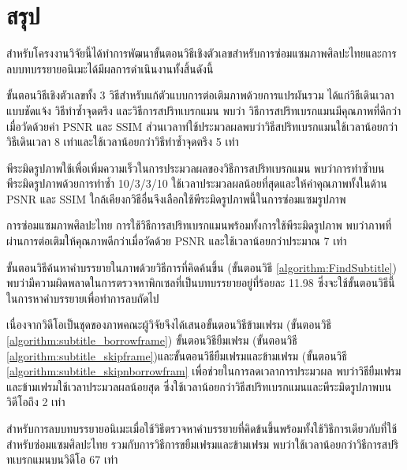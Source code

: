 \chapter{สรุป}

\hspace{1cm}สำหรับโครงงานวิจัยนี้ได้ทำการพัฒนาขั้นตอนวิธีเชิงตัวเลขสำหรับการซ่อมแซมภาพศิลปะไทยและการลบบทบรรยายอนิเมะได้มีผลการดำเนินงานทั้งสิ้นดังนี้

\hspace{1cm} ขั้นตอนวิธีเชิงตัวเลขทั้ง 3  วิธีสำหรับแก้ตัวแบบการต่อเติมภาพด้วยการแปรผันรวม ได้แก่วิธีเดินเวลาแบบชัดแจ้ง วิธีทำซ้ำจุดตรึง และวิธีการสปริทเบรกแมน พบว่า วิธีการสปริทเบรกแมนมีคุณภาพที่ดีกว่าเมื่อวัดด้วยค่า PSNR และ SSIM ส่วนเวลาท่ใช้ประมวลผลพบว่าวิธีสปริทเบรกแมนใช้เวลาน้อยกว่าวิธีเดินเวลา 8 เท่าและใช้เวลาน้อยกว่าวิธีทำซ้ำจุดตรึง 5 เท่า

\hspace{1cm} พีระมิดรูปภาพใช้เพื่อเพิ่มความเร็วในการประมวลผลของวิธีการสปริทเบรกแมน พบว่าการทำซ้ำบนพีระมิดรูปภาพด้วยการทำซ้ำ 10/3/3/10 ใช้เวลาประมวลผลน้อยที่สุดและให้ค่าคุณภาพทั้งในด้าน PSNR และ SSIM ใกล้เคียงกวิธีอื่นจึงเลือกใช้พีระมิดรูปภาพนี้ในการซ่อมแซมรูปภาพ

\hspace{1cm} การซ่อมแซมภาพศิลปะไทย การใช้วิธีการสปริทเบรกแมนพร้อมทั้งการใช้พีระมิดรูปภาพ พบว่าภาพที่ผ่านการต่อเติมให้คุณภาพดีกว่าเมื่อวัดด้วย PSNR และใช้เวลาน้อยกว่าประมาณ 7 เท่า

\hspace{1cm} ขั้นตอนวิธีค้นหาคำบรรยายในภาพด้วยวิธีการที่คิดค้นขึ้น (ขั้นตอนวิธี \ref{algorithm:FindSubtitle}) พบว่ามีความผิดพลาดในการตรวจหาพิกเซลที่เป็นบทบรรยายอยู่ที่ร้อยละ 11.98 ซึ่งจะใช้ขั้นตอนวิธีนี้ในการหาคำบรรยายเพื่อทำการลบถัดไป

\hspace{1cm} เนื่องจากวิดีโอเป็นชุดของภาพคณะผู้วิจัยจึงได้เสนอขั้นตอนวิธีข้ามเฟรม (ขั้นตอนวิธี \ref{algorithm:subtitle_borrowframe})  ขั้นตอนวิธียืมเฟรม (ขั้นตอนวิธี \ref{algorithm:subtitle_skipframe})และขั้นตอนวิธียืมเฟรมและข้ามเฟรม (ขั้นตอนวิธี \ref{algorithm:subtitle_skipnborrowfram} เพื่อช่วยในการลดเวลาการประมวผล พบว่าวิธียืมเฟรมและข้ามเฟรมใช้เวลาประมวลผลน้อยสุด ซึ่งใช้เวลาน้อยกว่าวิธีสปริทเบรกแมนและพีระมิดรูปภาพบนวิดีโอถึง 2 เท่า

\hspace{1cm} สำหรับการลบบทบรรยายอนิเมะเมื่อใช้วิธีตรวจหาคำบรรยายที่คิดข้นขึ้นพร้อมทั้งใช้วิธีการเดียวกับที่ใช้สำหรับซ่อมแซมศิลปะไทย รวมกับการวิธีการขยืมเฟรมและข้ามเฟรม พบว่าใช้เวลาน้อยกว่าวิธีการสปริทเบรกแมนบนวิดีโอ 67 เท่า

\clearpage